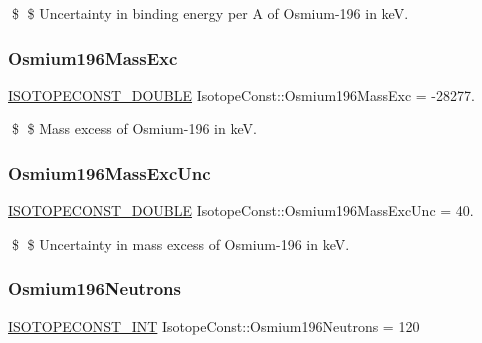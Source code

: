 \$ \$ Uncertainty in binding energy per A of Osmium-\/196 in keV. \mbox{\label{group___isotope_const-_osmium-_os196_gacddd7164f169caafc19f3fd7210d6ab4}} 
\subsubsection{\texorpdfstring{Osmium196\+Mass\+Exc}{Osmium196MassExc}}
{\footnotesize\ttfamily \mbox{\hyperlink{group___isotope_const-_macros_ga8f45a7272ce02c0b4c65c44636ed719a}{I\+S\+O\+T\+O\+P\+E\+C\+O\+N\+S\+T\+\_\+\+D\+O\+U\+B\+LE}} Isotope\+Const\+::\+Osmium196\+Mass\+Exc = -\/28277.}

\$ \$ Mass excess of Osmium-\/196 in keV. \mbox{\label{group___isotope_const-_osmium-_os196_gab90bcaf24d2b92f9965dafe64d06caa1}} 
\subsubsection{\texorpdfstring{Osmium196\+Mass\+Exc\+Unc}{Osmium196MassExcUnc}}
{\footnotesize\ttfamily \mbox{\hyperlink{group___isotope_const-_macros_ga8f45a7272ce02c0b4c65c44636ed719a}{I\+S\+O\+T\+O\+P\+E\+C\+O\+N\+S\+T\+\_\+\+D\+O\+U\+B\+LE}} Isotope\+Const\+::\+Osmium196\+Mass\+Exc\+Unc = 40.}

\$ \$ Uncertainty in mass excess of Osmium-\/196 in keV. \mbox{\label{group___isotope_const-_osmium-_os196_ga0423c36326b39e5ca52b46eab9f31c0a}} 
\subsubsection{\texorpdfstring{Osmium196\+Neutrons}{Osmium196Neutrons}}
{\footnotesize\ttfamily \mbox{\hyperlink{group___isotope_const-_macros_ga5f18360b3e99483a35c32d789e62621c}{I\+S\+O\+T\+O\+P\+E\+C\+O\+N\+S\+T\+\_\+\+I\+NT}} Isotope\+Const\+::\+Osmium196\+Neutrons = 120}

